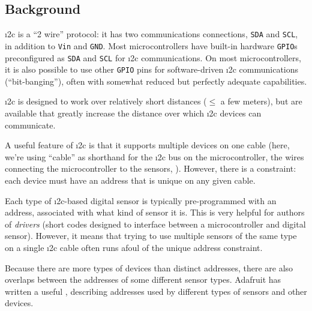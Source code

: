\subsection{Background}
\i2c is a ``2 wire'' protocol: it has two communications connections, \texttt{SDA} and \texttt{SCL}, in addition to \texttt{Vin} and \texttt{GND}.
Most microcontrollers have built-in hardware  \texttt{GPIO}s preconfigured as \texttt{SDA} and \texttt{SCL} for \i2c communications.
On most microcontrollers, it is also possible to use other \texttt{GPIO} pins for software-driven \i2c communications (``bit-banging''), often with somewhat reduced but perfectly adequate capabilities.

\i2c is designed to work over relatively short distances ($\le$ a few meters), but  are available that greatly increase the distance over which \i2c devices can communicate.

A useful feature of \i2c is that it supports multiple devices on one cable (here, we're using ``cable'' as shorthand for the \i2c bus on the microcontroller, the wires connecting the microcontroller to the sensors, \etc).
However, there is a constraint: each device must have an address that is unique on any given cable.

Each type of \i2c-based digital sensor is typically pre-programmed with an address, associated with what kind of sensor it is.
This is very helpful for authors of \emph{drivers} (short codes designed to interface between a microcontroller and digital sensor).
However, it means that trying to use multiple sensors of the same type on a single \i2c cable often runs afoul of the unique address constraint.

Because there are more types of devices than distinct addresses, there are also overlaps between the addresses of some different sensor types.
Adafruit has written a useful , describing addresses used by different types of sensors and other devices.


